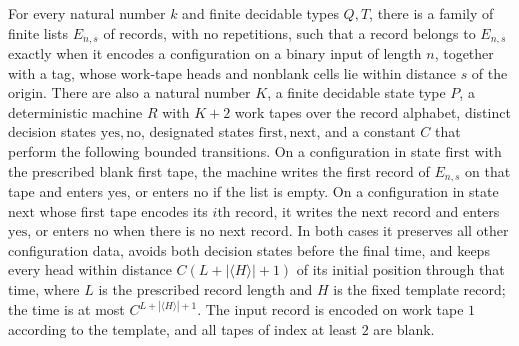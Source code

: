 \begin{theorem}
\label{Turing.exists_recordNextTM}
\leanok
{}
For every natural number $k$ and finite decidable types $Q,T$, there is a family of
finite lists $E_{n,s}$ of records, with no repetitions, such that a record belongs to
$E_{n,s}$ exactly when it encodes a configuration on a binary input of length $n$,
together with a tag, whose work-tape heads and nonblank cells lie within distance $s$ of
the origin. There are also a natural number $K$, a finite decidable state type $P$, a
deterministic machine $R$ with $K+2$ work tapes over the record alphabet, distinct
decision states $\mathrm{yes},\mathrm{no}$, designated states
$\mathrm{first},\mathrm{next}$, and a constant $C$ that perform the following bounded
transitions. On a configuration in state $\mathrm{first}$ with the prescribed blank
first tape, the machine writes the first record of $E_{n,s}$ on that tape and enters
$\mathrm{yes}$, or enters $\mathrm{no}$ if the list is empty. On a configuration in
state $\mathrm{next}$ whose first tape encodes its $i$th record, it writes the next
record and enters $\mathrm{yes}$, or enters $\mathrm{no}$ when there is no next record.
In both cases it preserves all other configuration data, avoids both decision states
before the final time, and keeps every head within distance $C(L+|\langle H\rangle|+1)$
of its initial position through that time, where $L$ is the prescribed record length and
$H$ is the fixed template record; the time is at most $C^{L+|\langle H\rangle|+1}$. The
input record is encoded on work tape $1$ according to the template, and all tapes of
index at least $2$ are blank.
\end{theorem}
